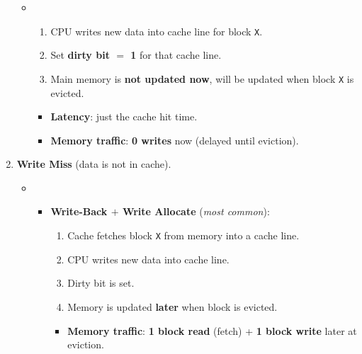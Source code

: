 \begin{enumerate}
\begin{itemize}
        \item {}
        \begin{enumerate}
            \item CPU writes new data into cache line for block \texttt{X}.
            \item Set \textbf{dirty bit $=$ 1} for that cache line.
            \item Main memory is \textbf{not updated now}, will be updated when block \texttt{X} is evicted.
        \end{enumerate}
        \begin{itemize}
            \item[\textcolor{Green3}{\faIcon{clock}}] \textcolor{Green3}{\textbf{Latency}}: just the cache hit time.
            \item[\textcolor{Green3}{\faIcon{traffic-light}}] \textcolor{Green3}{\textbf{Memory traffic}}: \textbf{0 writes} now (delayed until eviction).
        \end{itemize}
    \end{itemize}
    \item \textbf{Write Miss} (data is not in cache).
    \begin{itemize}
        \item {}
        \begin{itemize}
            \item \textbf{Write-Back $+$ Write Allocate} (\emph{most common}):
            \begin{enumerate}
                \item Cache fetches block \texttt{X} from memory into a cache line.
                \item CPU writes new data into cache line.
                \item Dirty bit is set.
                \item Memory is updated \textbf{later} when block is evicted.
            \end{enumerate}
            \begin{itemize}
                \item[\textcolor{Green3}{\faIcon{traffic-light}}] \textcolor{Green3}{\textbf{Memory traffic}}: \textbf{1 block read} (fetch) + \textbf{1 block write} later at eviction.
            \end{itemize}


\end{itemize}
\end{itemize}
\end{enumerate}
